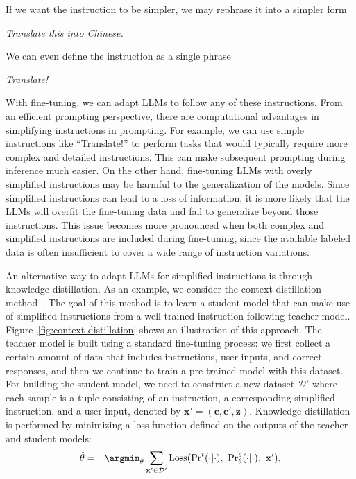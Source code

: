 \noindent If we want the instruction to be simpler, we may rephrase it into a simpler form

\vspace{1em}
\hspace{4em} \textit{Translate this into Chinese.}
\vspace{1em}

\noindent We can even define the instruction as a single phrase

\vspace{1em}
\hspace{4em} \textit{Translate!}
\vspace{1em}

With fine-tuning, we can adapt LLMs to follow any of these instructions. From an efficient prompting perspective, there are computational advantages in simplifying instructions in prompting. For example, we can use simple instructions like ``Translate!'' to perform tasks that would typically require more complex and detailed instructions. This can make subsequent prompting during inference much easier. On the other hand, fine-tuning LLMs with overly simplified instructions may be harmful to the generalization of the models. Since simplified instructions can lead to a loss of information, it is more likely that the LLMs will overfit the fine-tuning data and fail to generalize beyond those instructions. This issue becomes more pronounced when both complex and simplified instructions are included during fine-tuning, since the available labeled data is often insufficient to cover a wide range of instruction variations.

An alternative way to adapt LLMs for simplified instructions is through knowledge distillation. As an example, we consider the context distillation method~\cite{snell-etal:2022learning}. The goal of this method is to learn a student model that can make use of simplified instructions from a well-trained instruction-following teacher model. Figure~\ref{fig:context-distillation} shows an illustration of this approach. The teacher model is built using a standard fine-tuning process: we first collect a certain amount of data that includes instructions, user inputs, and correct responses, and then we continue to train a pre-trained model with this dataset. For building the student model, we need to construct a new dataset $\mathcal{D}'$ where each sample is a tuple consisting of an instruction, a corresponding simplified instruction, and a user input, denoted by $\mathbf{x}' = (\mathbf{c}, \mathbf{c}', \mathbf{z})$. Knowledge distillation is performed by minimizing a loss function defined on the outputs of the teacher and student models:
\begin{eqnarray}
\hat{\theta} & = & \argmin_{\theta} \sum_{\mathbf{x}' \in \mathcal{D}'} \mathrm{Loss}(\mathrm{Pr}^{t}(\cdot|\cdot),\ \mathrm{Pr}_{\theta}^{s}(\cdot|\cdot),\ \mathbf{x}'),
\end{eqnarray}


